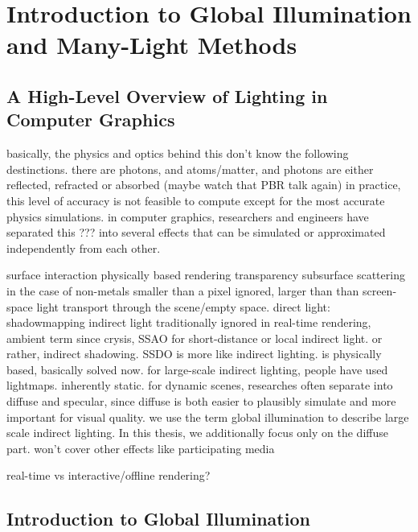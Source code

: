 
\chapter{Introduction to Global Illumination and Many-Light Methods}



\section{A High-Level Overview of Lighting in Computer Graphics}
\begin{outline}

\1 basically, the physics and optics behind this don't know the following destinctions. there are photons, and atoms/matter, and photons are either reflected, refracted or absorbed (maybe watch that PBR talk again)
\1 in practice, this level of accuracy is not feasible to compute except for the most accurate physics simulations.
\1 in computer graphics, researchers and engineers have separated this ??? into several effects that can be simulated or approximated independently from each other.

\1 surface interaction
    \2 physically based rendering
    \2 transparency
    \2 subsurface scattering in the case of non-metals
        \3 smaller than a pixel ignored, larger than than screen-space
\1 light transport through the scene/empty space.
    \2 direct light: shadowmapping
    \2 indirect light
        \3 traditionally ignored in real-time rendering, ambient term
        \3 since crysis, SSAO for short-distance or local indirect light. or rather, indirect shadowing.
        \3 SSDO is more like indirect lighting.
        \3 \citep{jimenez:2016:AO} is physically based, basically solved now.
        \3 for large-scale indirect lighting, people have used lightmaps. inherently static.
        \3 for dynamic scenes, researches often separate into diffuse and specular, since diffuse is both easier to plausibly simulate and more important for visual quality.
        \3 we use the term global illumination to describe large scale indirect lighting. In this thesis, we additionally focus only on the diffuse part.
    \2 won't cover other effects like participating media

\1 real-time vs interactive/offline rendering?
\end{outline}


\section{Introduction to Global Illumination}

